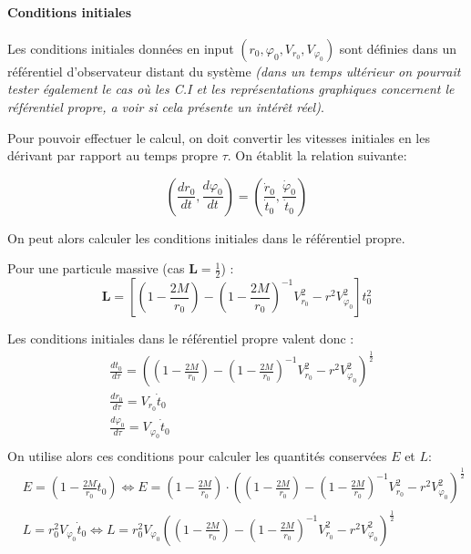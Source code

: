\documentclass{article}
\begin{document}
\paragraph{Conditions initiales}
Les conditions initiales données en input $(r_0, \varphi_0, V_{r_0}, V_{\varphi_0})$ sont définies dans un référentiel d'observateur distant du système \emph{(dans un temps ultérieur on pourrait tester également le cas où les C.I et les représentations graphiques concernent le référentiel propre, a voir si cela présente un intérêt réel)}.

Pour pouvoir effectuer le calcul, on doit convertir les vitesses initiales en les dérivant par rapport au temps propre $\tau$. On établit la relation suivante:

\[\left(\frac{dr_0}{dt}, \frac{d\varphi_0}{dt}\right)=\left(\frac{\dot r_0}{\dot t_0}, \frac{\dot \varphi _0}{\dot t_0}\right)\]
 
On peut alors calculer les conditions initiales dans le référentiel propre. 

Pour une particule massive (cas $\mathbf L=\frac{1}{2}$) :
\[\mathbf L=\left[\left(1-\frac{2M}{r_0}\right)-\left(1-\frac{2M}{r_0}\right)^{-1}V_{r_0}^2-r^2V_{\varphi _0}^2\right]t_0^2\]

Les conditions initiales dans le référentiel propre valent donc :
\begin{align*}
    &\frac{dt_0}{d\tau}=\left(\left(1-\frac{2M}{r_0}\right)-\left(1-\frac{2M}{r_0}\right)^{-1}V_{r_0}^2-r^2V_{\varphi _0}^2\right)^{\frac{1}{2}} \\
    &\frac{dr_0}{d\tau}=V_{r_0}\dot t_0\\
    &\frac{d\varphi _0}{d\tau}=V_{\varphi _0}\dot t_0\\
\end{align*}
On utilise alors ces conditions pour calculer les quantités conservées $E$ et $L$:
\begin{align*}&E=\left(1-\frac{2M}{r_0}\dot t_0\right) \iff E=\left(1-\frac{2M}{r_0}\right)\cdot\left(\left(1-\frac{2M}{r_0}\right)-\left(1-\frac{2M}{r_0}\right)^{-1}V_{r_0}^2-r^2V_{\varphi _0}^2\right)^{\frac{1}{2}} \\
&L = r_0^2 V_{\varphi_0}\dot t_0 \iff L= r_0^2 V_{\varphi_0}\left(\left(1-\frac{2M}{r_0}\right)-\left(1-\frac{2M}{r_0}\right)^{-1}V_{r_0}^2-r^2V_{\varphi _0}^2\right)^{\frac{1}{2}}\end{align*}
\end{document}
